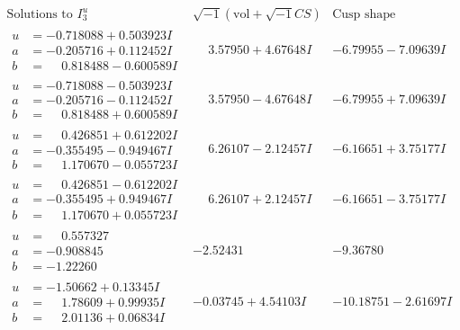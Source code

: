 \documentclass[1p]{elsarticle_modified}
\theoremstyle{definition}
\newcommand{\I}{\sqrt{-1}}
\begin{document}
$$\begin{array}{c|c|c}  
\text{Solutions to }I^u_{3}& \I (\text{vol} + \sqrt{-1}CS) & \text{Cusp shape}\\
 \hline 
\begin{aligned}
u &= -0.718088 + 0.503923 I \\
a &= -0.205716 + 0.112452 I \\
b &= \phantom{-}0.818488 - 0.600589 I\end{aligned}
 & \phantom{-}3.57950 + 4.67648 I & -6.79955 - 7.09639 I \\ \hline\begin{aligned}
u &= -0.718088 - 0.503923 I \\
a &= -0.205716 - 0.112452 I \\
b &= \phantom{-}0.818488 + 0.600589 I\end{aligned}
 & \phantom{-}3.57950 - 4.67648 I & -6.79955 + 7.09639 I \\ \hline\begin{aligned}
u &= \phantom{-}0.426851 + 0.612202 I \\
a &= -0.355495 - 0.949467 I \\
b &= \phantom{-}1.170670 - 0.055723 I\end{aligned}
 & \phantom{-}6.26107 - 2.12457 I & -6.16651 + 3.75177 I \\ \hline\begin{aligned}
u &= \phantom{-}0.426851 - 0.612202 I \\
a &= -0.355495 + 0.949467 I \\
b &= \phantom{-}1.170670 + 0.055723 I\end{aligned}
 & \phantom{-}6.26107 + 2.12457 I & -6.16651 - 3.75177 I \\ \hline\begin{aligned}
u &= \phantom{-}0.557327\phantom{ +0.000000I} \\
a &= -0.908845\phantom{ +0.000000I} \\
b &= -1.22260\phantom{ +0.000000I}\end{aligned}
 & -2.52431\phantom{ +0.000000I} & -9.36780\phantom{ +0.000000I} \\ \hline\begin{aligned}
u &= -1.50662 + 0.13345 I \\
a &= \phantom{-}1.78609 + 0.99935 I \\
b &= \phantom{-}2.01136 + 0.06834 I\end{aligned}
 & -0.03745 + 4.54103 I & -10.18751 - 2.61697 I \\ \hline\begin{aligned}

\end{aligned}
\end{array}$$
\end{document}
